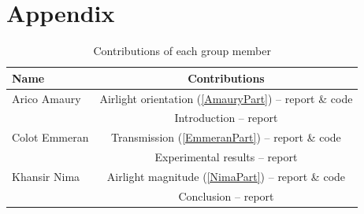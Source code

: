 \documentclass[conference]{IEEEtran}
\begin{document}
\section*{Appendix}
\begin{table}[h]
\centering
\caption{Contributions of each group member}
\begin{tabular}{|l|c|}
\hline
\textbf{Name} & \textbf{Contributions} \\
\hline
Arico Amaury & Airlight orientation (\ref{AmauryPart}) -- report \& code \\ 
& Introduction -- report\\
\hline
Colot Emmeran & Transmission (\ref{EmmeranPart}) -- report \& code \\ 
& Experimental results -- report\\
\hline
Khansir Nima & Airlight magnitude (\ref{NimaPart}) -- report \& code \\ 
& Conclusion -- report\\
\hline
\end{tabular}
\end{table}
\end{document}
